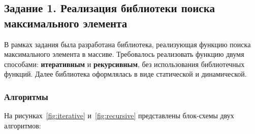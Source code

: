 \subsection{Задание 1. Реализация библиотеки поиска максимального элемента}

В рамках задания была разработана библиотека, реализующая функцию поиска максимального элемента в массиве. Требовалось реализовать функцию двумя способами: \textbf{итеративным} и \textbf{рекурсивным}, без использования библиотечных функций. Далее библиотека оформлялась в виде статической и динамической.

\subsubsection*{Алгоритмы}

На рисунках~\ref{fig:iterative} и~\ref{fig:recursive} представлены блок-схемы двух алгоритмов:

